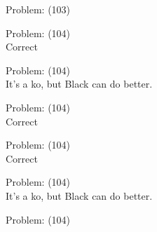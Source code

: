 \documentclass[11pt]{article}
\begin{document}
\begin{minipage}[t]{0.5\textwidth}
  {\centering
  
  Problem: (103)\\
  
  }
\end{minipage}
\begin{minipage}[t]{0.5\textwidth}
  {\centering
  
  Problem: (104)\\
  Correct\\
  }
\end{minipage}
\begin{minipage}[t]{0.5\textwidth}
  {\centering
  
  Problem: (104)\\
  It's a ko, but Black can do better.\\
  }
\end{minipage}
\begin{minipage}[t]{0.5\textwidth}
  {\centering
  
  Problem: (104)\\
  Correct\\
  }
\end{minipage}
\begin{minipage}[t]{0.5\textwidth}
  {\centering
  
  Problem: (104)\\
  Correct\\
  }
\end{minipage}
\begin{minipage}[t]{0.5\textwidth}
  {\centering
  
  Problem: (104)\\
  It's a ko, but Black can do better.\\
  }
\end{minipage}
\begin{minipage}[t]{0.5\textwidth}
  {\centering
  
  Problem: (104)\\
  
  }
\end{minipage}
\end{document}
